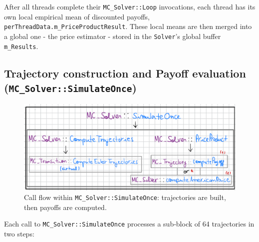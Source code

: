 \documentclass[11pt]{article}
\begin{document}
After all threads complete their \texttt{MC\_Solver::Loop} invocations, each thread has its own local empirical mean of discounted payoffs, \texttt{perThreadData.m\_PriceProductResult}. These local means are then merged into a global one - the price estimator - stored in the \texttt{Solver}’s global buffer \texttt{m\_Results}.


\subsection{Trajectory construction and Payoff evaluation (\texttt{MC\_Solver::SimulateOnce})} \label{construction-eval}

\begin{figure}[h]
  \centering
  \includegraphics[width=\textwidth]{SimulateOnceScheme.png}
  \caption{Call flow within \texttt{MC\_Solver::SimulateOnce}: trajectories are built, then payoffs are computed.}
\end{figure}

Each call to \texttt{MC\_Solver::SimulateOnce} processes a sub‐block of 64 trajectories in two steps:
\end{document}
